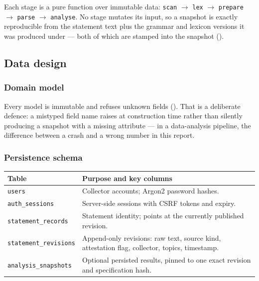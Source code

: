 Each stage is a pure function over immutable data:
\texttt{scan} $\rightarrow$ \texttt{lex} $\rightarrow$ \texttt{prepare} $\rightarrow$
\texttt{parse} $\rightarrow$ \texttt{analyse}. No stage mutates its input, so a snapshot
is exactly reproducible from the statement text plus the grammar and lexicon versions it
was produced under --- both of which are stamped into the snapshot ().


\subsection{Data design}

\subsubsection*{Domain model}


Every model is immutable and refuses unknown fields (). That is a deliberate
defence: a mistyped field name raises at construction time rather than silently producing
a snapshot with a missing attribute --- in a data-analysis pipeline, the difference between
a crash and a wrong number in this report.

\subsubsection*{Persistence schema}

\begin{center}
\small
\begin{tabular}{@{}l p{8.4cm}@{}}
\toprule
\textbf{Table} & \textbf{Purpose and key columns} \\
\midrule
\texttt{users} & Collector accounts; Argon2 password hashes. \\
\texttt{auth\_sessions} & Server-side sessions with CSRF tokens and expiry. \\
\texttt{statement\_records} & Statement identity; points at the currently published revision. \\
\texttt{statement\_revisions} & Append-only revisions: raw text, source kind, attestation flag, collector, topics, timestamp. \\
\texttt{analysis\_snapshots} & Optional persisted results, pinned to one exact revision and specification hash. \\
\bottomrule
\end{tabular}
\end{center}

